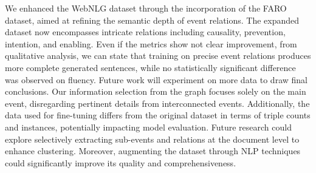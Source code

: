 \documentclass[
]{ceurart}
\begin{document}
We enhanced the WebNLG dataset through the incorporation of the FARO dataset, aimed at refining the semantic depth of event relations. The expanded dataset now encompasses intricate relations including causality, prevention, intention, and enabling.
Even if the metrics show not clear improvement, from qualitative analysis, we can state that training on precise event relations produces more complete generated sentences, while no statistically significant difference was observed on fluency. Future work will experiment on more data to draw final conclusions.
Our information selection from the graph focuses solely on the main event, disregarding pertinent details from interconnected events. Additionally, the data used for fine-tuning differs from the original dataset in terms of triple counts and instances, potentially impacting model evaluation. Future research could explore selectively extracting sub-events and relations at the document level to enhance clustering. Moreover, augmenting the dataset through NLP techniques could significantly improve its quality and comprehensiveness.
\end{document}
